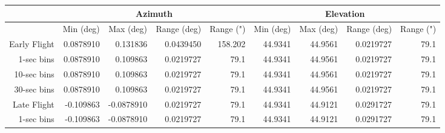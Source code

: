 {\begin{table}[htbp]
\begin{tabular}{|r|r|r|r|r|r|r|r|r|}
\hline
\multicolumn{1}{|l|}{} & \multicolumn{4}{c|}{Azimuth}                                                                                                             & \multicolumn{4}{c|}{Elevation}                                                                                                           \\ \hline
\multicolumn{1}{|l|}{} & \multicolumn{1}{c|}{Min (deg)} & \multicolumn{1}{c|}{Max (deg)} & \multicolumn{1}{c|}{Range (deg)} & \multicolumn{1}{c|}{Range (")} & \multicolumn{1}{c|}{Min (deg)} & \multicolumn{1}{c|}{Max (deg)} & \multicolumn{1}{c|}{Range (deg)} & \multicolumn{1}{c|}{Range (")} \\ \hline
Early Flight           & 0.0878910                      & 0.131836                       & 0.0439450                        & 158.202                             & 44.9341                        & 44.9561                        & 0.0219727                        & 79.1                                \\ \hline
1-sec bins             & 0.0878910                      & 0.109863                       & 0.0219727                        & 79.1                                & 44.9341                        & 44.9561                        & 0.0219727                        & 79.1                                \\ \hline
10-sec bins            & 0.0878910                      & 0.109863                       & 0.0219727                        & 79.1                                & 44.9341                        & 44.9561                        & 0.0219727                        & 79.1                                \\ \hline
30-sec bins            & 0.0878910                      & 0.109863                       & 0.0219727                        & 79.1                                & 44.9341                        & 44.9561                        & 0.0219727                        & 79.1                                \\ \hline
Late Flight            & -0.109863                      & -0.0878910                     & 0.0219727                        & 79.1                                & 44.9341                        & 44.9121                        & 0.0291727                        & 79.1                                \\ \hline
1-sec bins             & -0.109863                      & -0.0878910                     & 0.0219727                        & 79.1                                & 44.9341                        & 44.9121                        & 0.0291727                        & 79.1                                \\ \hline

\end{tabular}
\end{table}}
